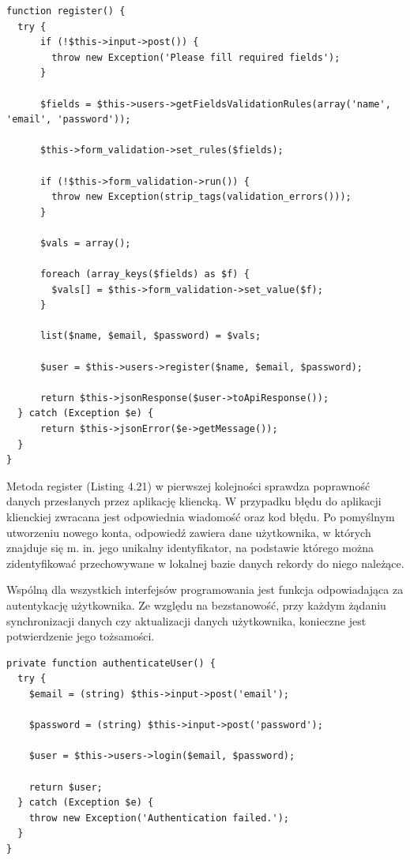 \begin{lstlisting}[style=php, caption=Rejestracja użytkowników przy użyciu metody register interfejsu Users\_api., label=amb, captionpos=b]
function register() {
  try {
      if (!$this->input->post()) {
      	throw new Exception('Please fill required fields');
      }

      $fields = $this->users->getFieldsValidationRules(array('name', 'email', 'password'));

      $this->form_validation->set_rules($fields);

      if (!$this->form_validation->run()) {
      	throw new Exception(strip_tags(validation_errors()));
      }

      $vals = array();

      foreach (array_keys($fields) as $f) {
      	$vals[] = $this->form_validation->set_value($f);
      }

      list($name, $email, $password) = $vals;

      $user = $this->users->register($name, $email, $password);

      return $this->jsonResponse($user->toApiResponse());
  } catch (Exception $e) {
      return $this->jsonError($e->getMessage());
  }
}
\end{lstlisting}

Metoda register (Listing 4.21) w pierwszej kolejności sprawdza poprawność danych przesłanych przez aplikację kliencką. W przypadku błędu do aplikacji klienckiej zwracana jest odpowiednia wiadomość oraz kod błędu. Po pomyślnym utworzeniu nowego konta, odpowiedź zawiera  dane użytkownika, w których znajduje się m. in. jego unikalny identyfikator, na podstawie którego można zidentyfikować przechowywane w lokalnej bazie danych rekordy do niego należące.

Wspólną dla wszystkich interfejsów programowania jest funkcja odpowiadająca za autentykację użytkownika. Ze względu na bezstanowość, przy każdym żądaniu synchronizacji danych czy aktualizacji danych użytkownika, konieczne jest potwierdzenie jego tożsamości.

\begin{lstlisting}[style=php, caption=Rejestracja użytkowników przy użyciu metody register interfejsu Users\_api., label=amb, captionpos=b]
private function authenticateUser() {
  try {
	$email = (string) $this->input->post('email');

	$password = (string) $this->input->post('password');

	$user = $this->users->login($email, $password);

    return $user;
  } catch (Exception $e) {
	throw new Exception('Authentication failed.');
  }
}
\end{lstlisting}

